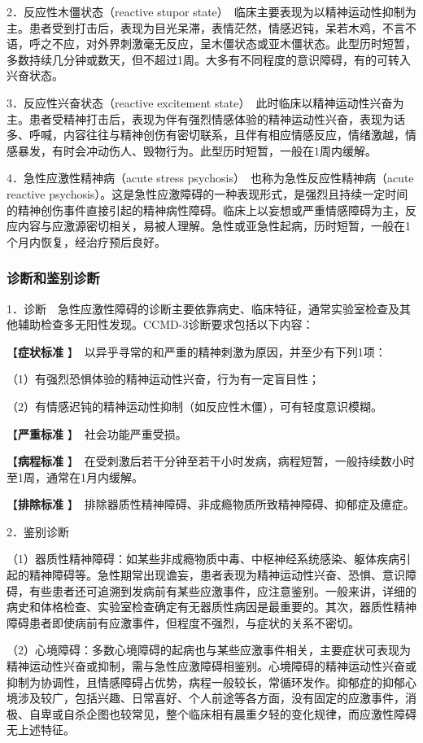 2．反应性木僵状态（reactive stupor
state）　临床主要表现为以精神运动性抑制为主。患者受到打击后，表现为目光呆滞，表情茫然，情感迟钝，呆若木鸡，不言不语，呼之不应，对外界刺激毫无反应，呈木僵状态或亚木僵状态。此型历时短暂，多数持续几分钟或数天，但不超过1周。大多有不同程度的意识障碍，有的可转入兴奋状态。

3．反应性兴奋状态（reactive excitement
state）　此时临床以精神运动性兴奋为主。患者受精神打击后，表现为伴有强烈情感体验的精神运动性兴奋，表现为话多、呼喊，内容往往与精神创伤有密切联系，且伴有相应情感反应，情绪激越，情感暴发，有时会冲动伤人、毁物行为。此型历时短暂，一般在1周内缓解。

4．急性应激性精神病（acute stress
psychosis）　也称为急性反应性精神病（acute reactive
psychosis）。这是急性应激障碍的一种表现形式，是强烈且持续一定时间的精神创伤事件直接引起的精神病性障碍。临床上以妄想或严重情感障碍为主，反应内容与应激源密切相关，易被人理解。急性或亚急性起病，历时短暂，一般在1个月内恢复，经治疗预后良好。

\subsubsection{诊断和鉴别诊断}

1．诊断　急性应激性障碍的诊断主要依靠病史、临床特征，通常实验室检查及其他辅助检查多无阳性发现。CCMD-3诊断要求包括以下内容：

【\textbf{症状标准}
】　以异乎寻常的和严重的精神刺激为原因，并至少有下列1项：

（1）有强烈恐惧体验的精神运动性兴奋，行为有一定盲目性；

（2）有情感迟钝的精神运动性抑制（如反应性木僵），可有轻度意识模糊。

【\textbf{严重标准} 】　社会功能严重受损。

【\textbf{病程标准}
】　在受刺激后若干分钟至若干小时发病，病程短暂，一般持续数小时至1周，通常在1月内缓解。

【\textbf{排除标准}
】　排除器质性精神障碍、非成瘾物质所致精神障碍、抑郁症及癔症。

2．鉴别诊断

（1）器质性精神障碍：如某些非成瘾物质中毒、中枢神经系统感染、躯体疾病引起的精神障碍等。急性期常出现谵妄，患者表现为精神运动性兴奋、恐惧、意识障碍，有些患者还可追溯到发病前有某些应激事件，应注意鉴别。一般来讲，详细的病史和体格检查、实验室检查确定有无器质性病因是最重要的。其次，器质性精神障碍患者即使病前有应激事件，但程度不强烈，与症状的关系不密切。

（2）心境障碍：多数心境障碍的起病也与某些应激事件相关，主要症状可表现为精神运动性兴奋或抑制，需与急性应激障碍相鉴别。心境障碍的精神运动性兴奋或抑制为协调性，且情感障碍占优势，病程一般较长，常循环发作。抑郁症的抑郁心境涉及较广，包括兴趣、日常喜好、个人前途等各方面，没有固定的应激事件，消极、自卑或自杀企图也较常见，整个临床相有晨重夕轻的变化规律，而应激性障碍无上述特征。

